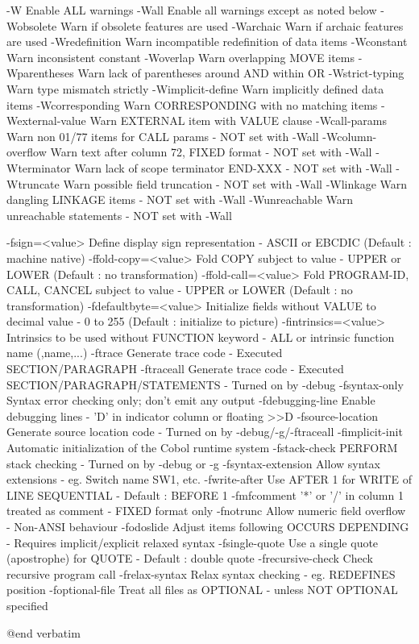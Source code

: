   -W                    Enable ALL warnings
  -Wall                 Enable all warnings except as noted below
  -Wobsolete            Warn if obsolete features are used
  -Warchaic             Warn if archaic features are used
  -Wredefinition        Warn incompatible redefinition of data items
  -Wconstant            Warn inconsistent constant
  -Woverlap             Warn overlapping MOVE items
  -Wparentheses         Warn lack of parentheses around AND within OR
  -Wstrict-typing       Warn type mismatch strictly
  -Wimplicit-define     Warn implicitly defined data items
  -Wcorresponding       Warn CORRESPONDING with no matching items
  -Wexternal-value      Warn EXTERNAL item with VALUE clause
  -Wcall-params         Warn non 01/77 items for CALL params
			- NOT set with -Wall
  -Wcolumn-overflow     Warn text after column 72, FIXED format
			- NOT set with -Wall
  -Wterminator          Warn lack of scope terminator END-XXX
			- NOT set with -Wall
  -Wtruncate            Warn possible field truncation
			- NOT set with -Wall
  -Wlinkage             Warn dangling LINKAGE items
			- NOT set with -Wall
  -Wunreachable         Warn unreachable statements
			- NOT set with -Wall

  -fsign=<value>        Define display sign representation
			- ASCII or EBCDIC (Default : machine native)
  -ffold-copy=<value>   Fold COPY subject to value
			- UPPER or LOWER (Default : no transformation)
  -ffold-call=<value>   Fold PROGRAM-ID, CALL, CANCEL subject to value
			- UPPER or LOWER (Default : no transformation)
  -fdefaultbyte=<value> Initialize fields without VALUE to decimal value
			- 0 to 255 (Default : initialize to picture)
  -fintrinsics=<value>  Intrinsics to be used without FUNCTION keyword
			- ALL or intrinsic function name (,name,...)
  -ftrace               Generate trace code
			- Executed SECTION/PARAGRAPH
  -ftraceall            Generate trace code
			- Executed SECTION/PARAGRAPH/STATEMENTS
			- Turned on by -debug
  -fsyntax-only         Syntax error checking only; don't emit any output
  -fdebugging-line      Enable debugging lines
			- 'D' in indicator column or floating >>D
  -fsource-location     Generate source location code
			- Turned on by -debug/-g/-ftraceall
  -fimplicit-init       Automatic initialization of the Cobol runtime system
  -fstack-check         PERFORM stack checking
			- Turned on by -debug or -g
  -fsyntax-extension    Allow syntax extensions
			- eg. Switch name SW1, etc.
  -fwrite-after         Use AFTER 1 for WRITE of LINE SEQUENTIAL
			- Default : BEFORE 1
  -fmfcomment           '*' or '/' in column 1 treated as comment
			- FIXED format only
  -fnotrunc             Allow numeric field overflow
			- Non-ANSI behaviour
  -fodoslide            Adjust items following OCCURS DEPENDING
			- Requires implicit/explicit relaxed syntax
  -fsingle-quote        Use a single quote (apostrophe) for QUOTE
			- Default : double quote
  -frecursive-check     Check recursive program call
  -frelax-syntax        Relax syntax checking
			- eg. REDEFINES position
  -foptional-file       Treat all files as OPTIONAL
			- unless NOT OPTIONAL specified

@end verbatim

